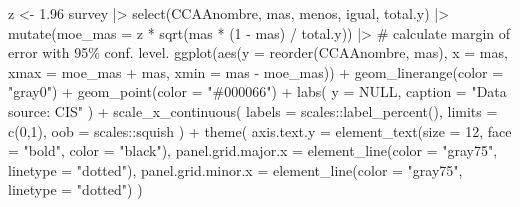 \documentclass[
]{report}
\newenvironment{Shaded}{\begin{snugshade}}{\end{snugshade}}
\newcommand{\AttributeTok}[1]{\textcolor[rgb]{0.40,0.45,0.13}{#1}}
\newcommand{\CommentTok}[1]{\textcolor[rgb]{0.37,0.37,0.37}{#1}}
\newcommand{\ConstantTok}[1]{\textcolor[rgb]{0.56,0.35,0.01}{#1}}
\newcommand{\DecValTok}[1]{\textcolor[rgb]{0.68,0.00,0.00}{#1}}
\newcommand{\FloatTok}[1]{\textcolor[rgb]{0.68,0.00,0.00}{#1}}
\newcommand{\FunctionTok}[1]{\textcolor[rgb]{0.28,0.35,0.67}{#1}}
\newcommand{\NormalTok}[1]{\textcolor[rgb]{0.00,0.23,0.31}{#1}}
\newcommand{\OtherTok}[1]{\textcolor[rgb]{0.00,0.23,0.31}{#1}}
\newcommand{\SpecialCharTok}[1]{\textcolor[rgb]{0.37,0.37,0.37}{#1}}
\newcommand{\StringTok}[1]{\textcolor[rgb]{0.13,0.47,0.30}{#1}}
\begin{document}
\begin{Shaded}
\begin{Highlighting}[]
\NormalTok{z }\OtherTok{\textless{}{-}}  \FloatTok{1.96}
\NormalTok{survey }\SpecialCharTok{|\textgreater{}} 
  \FunctionTok{select}\NormalTok{(CCAAnombre, mas, menos, igual, total.y) }\SpecialCharTok{|\textgreater{}} 
  \FunctionTok{mutate}\NormalTok{(}\AttributeTok{moe\_mas =}\NormalTok{ z }\SpecialCharTok{*} \FunctionTok{sqrt}\NormalTok{(mas }\SpecialCharTok{*}\NormalTok{ (}\DecValTok{1} \SpecialCharTok{{-}}\NormalTok{ mas) }\SpecialCharTok{/}\NormalTok{ total.y)) }\SpecialCharTok{|\textgreater{}} \CommentTok{\# calculate margin of error with 95\% conf. level.}
    \FunctionTok{ggplot}\NormalTok{(}\FunctionTok{aes}\NormalTok{(}\AttributeTok{y =} \FunctionTok{reorder}\NormalTok{(CCAAnombre, mas), }\AttributeTok{x =}\NormalTok{ mas,}
             \AttributeTok{xmax =}\NormalTok{ moe\_mas }\SpecialCharTok{+}\NormalTok{ mas, }
             \AttributeTok{xmin =}\NormalTok{ mas }\SpecialCharTok{{-}}\NormalTok{ moe\_mas)) }\SpecialCharTok{+}
  \FunctionTok{geom\_linerange}\NormalTok{(}\AttributeTok{color =} \StringTok{"gray0"}\NormalTok{) }\SpecialCharTok{+}
  \FunctionTok{geom\_point}\NormalTok{(}\AttributeTok{color =} \StringTok{"\#000066"}\NormalTok{) }\SpecialCharTok{+}
  \FunctionTok{labs}\NormalTok{( }
    \AttributeTok{y =} \ConstantTok{NULL}\NormalTok{,}
    \AttributeTok{caption =} \StringTok{"Data source: CIS"}
\NormalTok{  ) }\SpecialCharTok{+}
  \FunctionTok{scale\_x\_continuous}\NormalTok{(}
    \AttributeTok{labels =}\NormalTok{ scales}\SpecialCharTok{::}\FunctionTok{label\_percent}\NormalTok{(),}
    \AttributeTok{limits =} \FunctionTok{c}\NormalTok{(}\DecValTok{0}\NormalTok{,}\DecValTok{1}\NormalTok{),}
    \AttributeTok{oob =}\NormalTok{ scales}\SpecialCharTok{::}\NormalTok{squish}
\NormalTok{  )  }\SpecialCharTok{+}
  \FunctionTok{theme}\NormalTok{(}
    \AttributeTok{axis.text.y =} \FunctionTok{element\_text}\NormalTok{(}\AttributeTok{size =} \DecValTok{12}\NormalTok{, }\AttributeTok{face =} \StringTok{"bold"}\NormalTok{, }\AttributeTok{color =} \StringTok{"black"}\NormalTok{),}
    \AttributeTok{panel.grid.major.x =} \FunctionTok{element\_line}\NormalTok{(}\AttributeTok{color =} \StringTok{"gray75"}\NormalTok{, }\AttributeTok{linetype =} \StringTok{"dotted"}\NormalTok{),}
    \AttributeTok{panel.grid.minor.x =} \FunctionTok{element\_line}\NormalTok{(}\AttributeTok{color =} \StringTok{"gray75"}\NormalTok{, }\AttributeTok{linetype =} \StringTok{"dotted"}\NormalTok{)}
\NormalTok{  )}
\end{Highlighting}
\end{Shaded}
\end{document}
